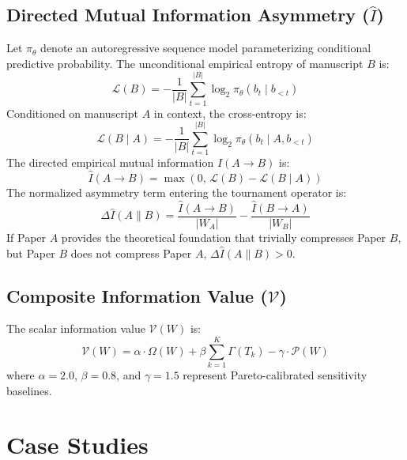 \documentclass[twocolumn,10pt,letterpaper]{article}
\begin{document}
\subsection{Directed Mutual Information Asymmetry ($\hat{I}$)}
Let $\pi_\theta$ denote an autoregressive sequence model parameterizing conditional predictive probability. The unconditional empirical entropy of manuscript $B$ is:
\begin{equation}
\mathcal{L}(B) = -\frac{1}{|B|} \sum_{t=1}^{|B|} \log_2 \pi_\theta(b_t \mid b_{<t})
\end{equation}
Conditioned on manuscript $A$ in context, the cross-entropy is:
\begin{equation}
\mathcal{L}(B \mid A) = -\frac{1}{|B|} \sum_{t=1}^{|B|} \log_2 \pi_\theta(b_t \mid A, b_{<t})
\end{equation}
The directed empirical mutual information $\hat{I}(A \to B)$ is:
\begin{equation}
\hat{I}(A \to B) = \max\left(0, \, \mathcal{L}(B) - \mathcal{L}(B \mid A)\right)
\end{equation}
The normalized asymmetry term entering the tournament operator is:
\begin{equation}
\Delta \hat{I}(A \parallel B) = \frac{\hat{I}(A \to B)}{|W_A|} - \frac{\hat{I}(B \to A)}{|W_B|}
\end{equation}
If Paper $A$ provides the theoretical foundation that trivially compresses Paper $B$, but Paper $B$ does not compress Paper $A$, $\Delta \hat{I}(A \parallel B) > 0$.

\subsection{Composite Information Value ($\mathcal{V}$)}
The scalar information value $\mathcal{V}(W)$ is:
\begin{equation}
\mathcal{V}(W) = \alpha \cdot \Omega(W) + \beta \sum_{k=1}^K \Gamma(T_k) - \gamma \cdot \mathcal{P}(W)
\end{equation}
where $\alpha = 2.0$, $\beta = 0.8$, and $\gamma = 1.5$ represent Pareto-calibrated sensitivity baselines.



\section{Case Studies}
\end{document}
